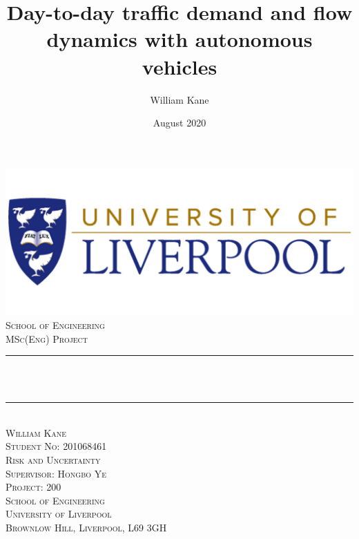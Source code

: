 \documentclass[12pt, a4paper, onecolumn]{article}
\title{
Day-to-day traffic demand and flow dynamics with autonomous vehicles}
\author{William Kane}
\date{August 2020}
\makeatletter
\let\thetitle\@title
\let\thedate\@date
\makeatother
\begin{document}


\begin{titlepage}

	\centering
    \includegraphics[scale = 0.2]{UniOfLiverpoolLogo2.jpg}\\[0.5 cm]
    \textsc{\LARGE School of Engineering}\\[0.5 cm]
	\textsc{\Large MSc(Eng) Project}\\[1 cm]
	\rule{\linewidth}{0.2 mm} \\[0.4 cm]
	{ \huge \bfseries \thetitle}\\
	\rule{\linewidth}{0.2 mm} \\[1.0 cm]
	\textsc{\huge William Kane} \\[0.5 cm]
	\textsc{\Large Student No: 201068461} \\[0.5 cm]
	\textsc{\large Risk and Uncertainty} \\[1 cm]
	\textsc{\LARGE Supervisor: Hongbo Ye} \\[0.5 cm]
	\textsc{\Large Project: 200} \\[0.5 cm]
	\textsc{\large School of Engineering\\ University of Liverpool\\ Brownlow Hill, Liverpool, L69 3GH} \\[0.5 cm]
	{\Large \thedate}\\[2 cm]
	\vfill

\end{titlepage}

\end{document}
